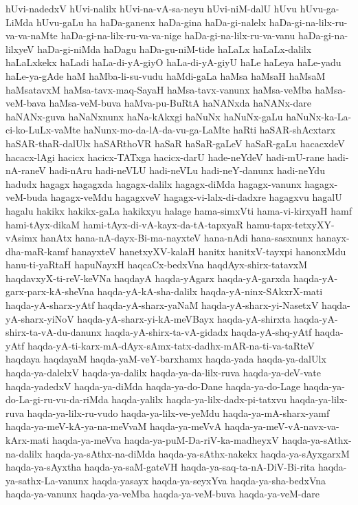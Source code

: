 {hUvi-nadedxV
hUvi-nalilx
hUvi-na-vA-sa-neyu
hUvi-niM-dalU
hUvu
hUvu-ga-LiMda
hUvu-gaLu
ha
haDa-ganenx
haDa-gina
haDa-gi-nalelx
haDa-gi-na-lilx-ru-va-va-naMte
haDa-gi-na-lilx-ru-va-va-nige
haDa-gi-na-lilx-ru-va-vanu
haDa-gi-na-lilxyeV
haDa-gi-niMda
haDagu
haDa-gu-niM-tide
haLaLx
haLaLx-dalilx
haLaLxkekx
haLadi
haLa-di-yA-giyO
haLa-di-yA-giyU
haLe
haLeya
haLe-yadu
haLe-ya-gAde
haM
haMba-li-su-vudu
haMdi-gaLa
haMsa
haMsaH
haMsaM
haMsatavxM
haMsa-tavx-maq-SayaH
haMsa-tavx-vanunx
haMsa-veMba
haMsa-veM-bava
haMsa-veM-buva
haMva-pu-BuRtA
haNANxda
haNANx-dare
haNANx-guva
haNaNxnunx
haNa-kAkxgi
haNuNx
haNuNx-gaLu
haNuNx-ka-La-ci-ko-LuLx-vaMte
haNunx-mo-da-lA-da-vu-ga-LaMte
haRti
haSAR-shAcxtarx
haSAR-thaR-dalUlx
haSARthoVR
haSaR
haSaR-gaLeV
haSaR-gaLu
hacacxdeV
hacacx-lAgi
hacicx
hacicx-TATxga
hacicx-darU
hade-neYdeV
hadi-mU-rane
hadi-nA-raneV
hadi-nAru
hadi-neVLU
hadi-neVLu
hadi-neY-danunx
hadi-neYdu
hadudx
hagagx
hagagxda
hagagx-dalilx
hagagx-diMda
hagagx-vanunx
hagagx-veM-buda
hagagx-veMdu
hagagxveV
hagagx-vi-lalx-di-dadxre
hagagxvu
hagalU
hagalu
hakikx
hakikx-gaLa
hakikxyu
halage
hama-simxVti
hama-vi-kirxyaH
hamf
hami-tAyx-dikaM
hami-tAyx-di-vA-kayx-da-tA-tapxyaR
hamu-tapx-tetxyXY-vAsimx
hanAtx
hana-nA-dayx-Bi-ma-nayxteV
hana-nAdi
hana-sasxnunx
hanayx-dha-maR-kamf
hanayxteV
hanetxyXV-kalaH
hanitx
hanitxV-tayxpi
hanonxMdu
hanu-ti-yaRtaH
hapuNayxH
haqcaCx-bedxVna
haqdAyx-shirx-tatavxM
haqdavxyX-ti-reV-keVNa
haqdayA
haqda-yAgarx
haqda-yA-garxda
haqda-yA-garx-parx-kA-sheVna
haqda-yA-kA-sha-dalilx
haqda-yA-ninx-SAkxrX-mati
haqda-yA-sharx-yAtf
haqda-yA-sharx-yaNaM
haqda-yA-sharx-yi-NasetxV
haqda-yA-sharx-yiNoV
haqda-yA-sharx-yi-kA-meVBayx
haqda-yA-shirxta
haqda-yA-shirx-ta-vA-du-danunx
haqda-yA-shirx-ta-vA-gidadx
haqda-yA-shq-yAtf
haqda-yAtf
haqda-yA-ti-karx-mA-dAyx-sAmx-tatx-dadhx-mAR-na-ti-va-taRteV
haqdaya
haqdayaM
haqda-yaM-veY-barxhamx
haqda-yada
haqda-ya-dalUlx
haqda-ya-dalelxV
haqda-ya-dalilx
haqda-ya-da-lilx-ruva
haqda-ya-deV-vate
haqda-yadedxV
haqda-ya-diMda
haqda-ya-do-Dane
haqda-ya-do-Lage
haqda-ya-do-La-gi-ru-vu-da-riMda
haqda-yalilx
haqda-ya-lilx-dadx-pi-tatxvu
haqda-ya-lilx-ruva
haqda-ya-lilx-ru-vudo
haqda-ya-lilx-ve-yeMdu
haqda-ya-mA-sharx-yamf
haqda-ya-meV-kA-ya-na-meVvaM
haqda-ya-meVvA
haqda-ya-meV-vA-navx-va-kArx-mati
haqda-ya-meVva
haqda-ya-puM-Da-riV-ka-madheyxV
haqda-ya-sAthx-na-dalilx
haqda-ya-sAthx-na-diMda
haqda-ya-sAthx-nakekx
haqda-ya-sAyxgarxM
haqda-ya-sAyxtha
haqda-ya-saM-gateVH
haqda-ya-saq-ta-nA-DiV-Bi-rita
haqda-ya-sathx-La-vanunx
haqda-yasayx
haqda-ya-seyxYva
haqda-ya-sha-bedxVna
haqda-ya-vanunx
haqda-ya-veMba
haqda-ya-veM-buva
haqda-ya-veM-dare
}
